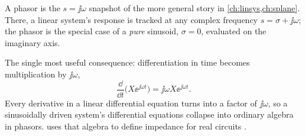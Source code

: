 \begin{controlsbox}
A phasor is the \(s=\jj\omega\) snapshot of the more general story in
\cref{ch:linsys,ch:splane}. There, a linear system's response is tracked at any
complex frequency \(s=\sigma+\jj\omega\); the phasor is the special case of a
\emph{pure} sinusoid, \(\sigma=0\), evaluated on the imaginary axis.
\cite[pp.~54--56]{leigh2012control}
\end{controlsbox}

The single most useful consequence: differentiation in time becomes
multiplication by \(\jj\omega\),
\[
\frac{\dd}{\dd t}\bigl(X\ee^{\jj\omega t}\bigr)=\jj\omega X\ee^{\jj\omega t}.
\]
Every derivative in a linear differential equation turns into a factor of
\(\jj\omega\), so a sinusoidally driven system's differential equations collapse
into ordinary algebra in phasors.  uses that algebra to define
impedance for real circuits \cite[pp.~22--28]{white2004highfrequency}.
